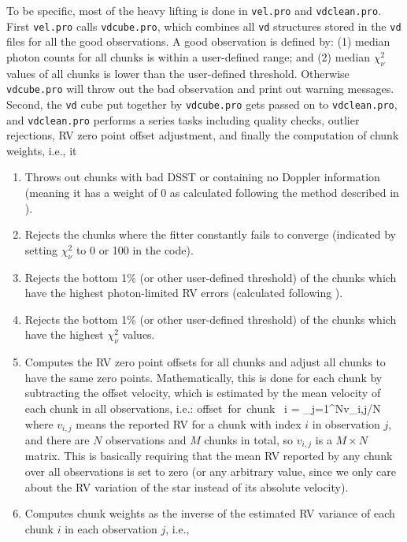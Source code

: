To be specific, most of the heavy lifting is done in {\tt vel.pro} and
{\tt vdclean.pro}. First {\tt vel.pro} calls {\tt vdcube.pro}, which
combines all {\tt vd} structures stored in the {\tt vd} files for all the
good observations. A good observation is defined by: (1) median photon
counts for all chunks is within a user-defined range; and (2) median
$\chi_\nu^2$ values of all chunks is lower than the user-defined
threshold. Otherwise {\tt vdcube.pro} will throw out the bad
observation and print out warning messages. Second, the {\tt vd} cube
put together by {\tt vdcube.pro} gets passed on to {\tt vdclean.pro},
and {\tt vdclean.pro} performs a series tasks including quality checks, outlier
rejections, RV zero point offset adjustment, and finally the
computation of chunk weights, i.e., it
\begin{enumerate}
\item Throws out chunks with bad DSST or containing no Doppler
  information (meaning it has a weight of 0 as calculated following
  the method described in \citealt{butler1996}).
\item Rejects the chunks where the fitter constantly fails to converge
  (indicated by setting $\chi_\nu^2$ to 0 or 100 in the code).  
\item Rejects the bottom 1\% (or other user-defined threshold) of the
  chunks which have the highest photon-limited RV errors (calculated
  following \citealt{butler1996}).
\item Rejects the bottom 1\% (or other user-defined threshold) of the
  chunks which have the highest $\chi_\nu^2$ values.
\item Computes the RV zero point offsets for all chunks and adjust all
  chunks to have the same zero points. Mathematically, this is done
  for each chunk by subtracting the offset velocity, which is
  estimated by the mean velocity of each chunk in all observations,
  i.e.:
  \beq
  {\rm offset\ for\ chunk\ } i = \sum_{j=1}^{N}{v_{i,j}}/N
  \eeq
  where $v_{i,j}$ means the reported RV for a chunk with
  index $i$ in observation $j$, and there are $N$
  observations and $M$ chunks in total, so $v_{i,j}$ is a
  $M \times N$ matrix. This is basically requiring that the mean RV
  reported by any chunk over all observations is set to zero (or any
  arbitrary value, since we only care about the RV variation of the
  star instead of its absolute velocity).
\item Computes chunk weights as the inverse of the estimated RV
  variance of each chunk $i$ in each observation $j$, i.e.,

\end{enumerate}
